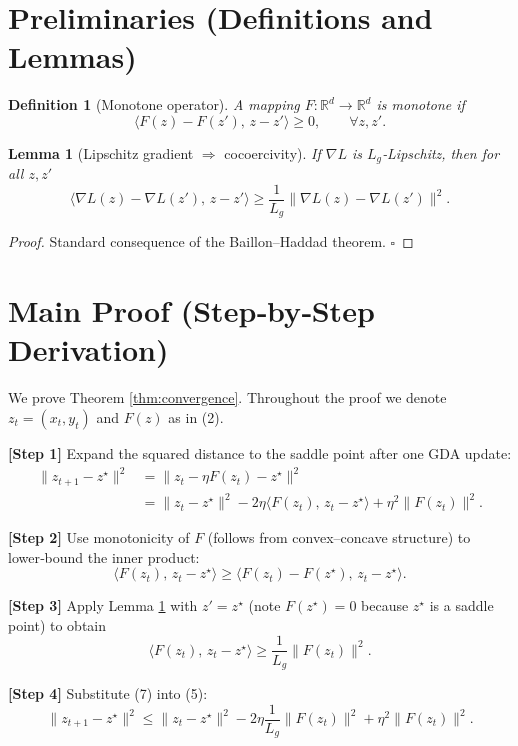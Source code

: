 \documentclass{article}
\newtheorem{lemma}{Lemma}
\newtheorem{definition}{Definition}
\begin{document}
\section*{Preliminaries (Definitions and Lemmas)}
\begin{definition}[Monotone operator]
A mapping $F:\mathbb{R}^{d}\rightarrow\mathbb{R}^{d}$ is monotone if  
\[
\langle F(z)-F(z'),\,z-z'\rangle\ge 0,\qquad\forall z,z'.
\]
\end{definition}

\begin{lemma}[Lipschitz gradient $\Rightarrow$ cocoercivity]\label{lem:coco}
If $\nabla L$ is $L_{g}$‑Lipschitz, then for all $z,z'$
\[
\langle \nabla L(z)-\nabla L(z'),\,z-z'\rangle
\ge\frac{1}{L_{g}}\|\nabla L(z)-\nabla L(z')\|^{2}.
\tag{4}
\]
\end{lemma}
\begin{proof}
Standard consequence of the Baillon–Haddad theorem. $\square$
\end{proof}

\section*{Main Proof (Step‑by‑Step Derivation)}
We prove Theorem \ref{thm:convergence}.  Throughout the proof we denote $z_{t}=(x_{t},y_{t})$ and $F(z)$ as in (2).  

\noindent\textbf{[Step 1]} Expand the squared distance to the saddle point after one GDA update:
\[
\begin{aligned}
\|z_{t+1}-z^{\star}\|^{2}
&= \|z_{t}-\eta F(z_{t})-z^{\star}\|^{2}\\
&= \|z_{t}-z^{\star}\|^{2}
-2\eta\langle F(z_{t}),\,z_{t}-z^{\star}\rangle
+\eta^{2}\|F(z_{t})\|^{2}.
\end{aligned}
\tag{5}
\]

\noindent\textbf{[Step 2]} Use monotonicity of $F$ (follows from convex–concave structure) to lower‑bound the inner product:
\[
\langle F(z_{t}),\,z_{t}-z^{\star}\rangle
\ge \langle F(z_{t})-F(z^{\star}),\,z_{t}-z^{\star}\rangle .
\tag{6}
\]

\noindent\textbf{[Step 3]} Apply Lemma \ref{lem:coco} with $z'=z^{\star}$ (note $F(z^{\star})=0$ because $z^{\star}$ is a saddle point) to obtain
\[
\langle F(z_{t}),\,z_{t}-z^{\star}\rangle
\ge \frac{1}{L_{g}}\|F(z_{t})\|^{2}.
\tag{7}
\]

\noindent\textbf{[Step 4]} Substitute (7) into (5):
\[
\|z_{t+1}-z^{\star}\|^{2}
\le \|z_{t}-z^{\star}\|^{2}
-2\eta\frac{1}{L_{g}}\|F(z_{t})\|^{2}
+\eta^{2}\|F(z_{t})\|^{2}.
\tag{8}
\]
\end{document}
